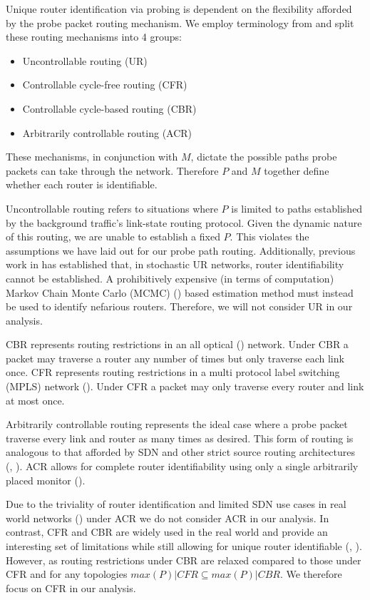 Unique router identification via probing is dependent on the flexibility afforded by the probe packet routing mechanism. We employ terminology from \cite{he_network_2021} and split these routing mechanisms into 4 groups: \begin{itemize}
    \item Uncontrollable routing (UR)
    \item Controllable cycle-free routing (CFR)
    \item Controllable cycle-based routing (CBR)
    \item Arbitrarily controllable routing (ACR)
\end{itemize}
These mechanisms, in conjunction with $M$, dictate the possible paths probe packets can take through the network. Therefore $P$ and $M$ together define whether each router is identifiable.\par
Uncontrollable routing refers to situations where $P$ is limited to paths established by the background traffic's link-state routing protocol. Given the dynamic nature of this routing, we are unable to establish a fixed $P$. This violates the assumptions we have laid out for our probe path routing. Additionally, previous work in \cite{barnes_stochastic_2020} has established that, in stochastic UR networks, router identifiability cannot be established. A prohibitively expensive (in terms of computation) Markov Chain Monte Carlo (MCMC) (\cite{dellaportas_bayesian_2002}) based estimation method must instead be used to identify nefarious routers. Therefore, we will not consider UR in our analysis.\par
CBR represents routing restrictions in an all optical (\cite{ahuja_srlg_2011}) network. Under CBR a packet may traverse a router any number of times but only traverse each link once. CFR represents routing restrictions in a multi protocol label switching (MPLS) network (\cite{rosen_multiprotocol_2001}). Under CFR a packet may only traverse every router and link at most once.\par
Arbitrarily controllable routing represents the ideal case where a probe packet traverse every link and router as many times as desired. This form of routing is analogous to that afforded by SDN and other strict source routing architectures (\cite{university_of_southern_california_darpa_1981}, \cite{open_networking_foundation_openflow_2015}). ACR allows for complete router identifiability using only a single arbitrarily placed monitor (\cite{he_network_2021}).\par
Due to the triviality of router identification and limited SDN use cases in real world networks (\cite{jarschel_interfaces_2014}) under ACR we do not consider ACR in our analysis. In contrast, CFR and CBR are widely used in the real world and provide an interesting set of limitations while still allowing for unique router identifiable (\cite{ahuja_srlg_2011}, \cite{thomas_ldp_2001}). However, as routing restrictions under CBR are relaxed compared to those under CFR and for any topologies $max(P)|CFR \subseteq max(P)|CBR$. We therefore focus on CFR in our analysis.\par


